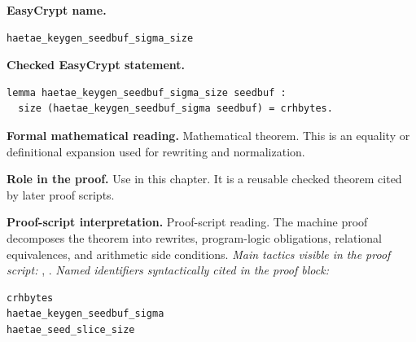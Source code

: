 \begin{formaltheorem}
\noindent\textbf{EasyCrypt name.}
\begin{lstlisting}[language=EasyCrypt,basicstyle=\ttfamily\scriptsize]
haetae_keygen_seedbuf_sigma_size
\end{lstlisting}
\noindent\textbf{Checked EasyCrypt statement.}
\begin{lstlisting}[language=EasyCrypt,basicstyle=\ttfamily\scriptsize]
lemma haetae_keygen_seedbuf_sigma_size seedbuf :
  size (haetae_keygen_seedbuf_sigma seedbuf) = crhbytes.
\end{lstlisting}
\noindent\textbf{Formal mathematical reading.}
Mathematical theorem. This is an equality or definitional expansion used for rewriting and normalization.

\noindent\textbf{Role in the proof.}
Use in this chapter. It is a reusable checked theorem cited by later proof scripts.

\noindent\textbf{Proof-script interpretation.}
Proof-script reading. The machine proof decomposes the theorem into rewrites, program-logic obligations, relational equivalences, and arithmetic side conditions.
\emph{Main tactics visible in the proof script:} , .
\emph{Named identifiers syntactically cited in the proof block:}
\begin{lstlisting}[language=EasyCrypt,basicstyle=\ttfamily\scriptsize]
crhbytes
haetae_keygen_seedbuf_sigma
haetae_seed_slice_size
\end{lstlisting}

\end{formaltheorem}

